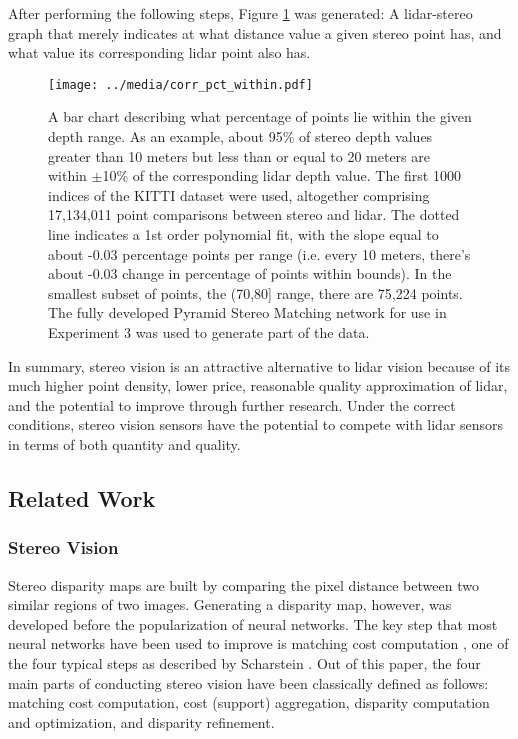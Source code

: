 After performing the following steps, Figure \ref{corr_stereo_lidar} was generated: A lidar-stereo graph that merely indicates at what distance value a given stereo point has, and what value its corresponding lidar point also has.

\begin{figure}[ht]
	\centering
	\texttt{[image: ../media/corr\_pct\_within.pdf]}
	\caption{A bar chart describing what percentage of points lie within the given depth range. As an example, about 95\% of stereo depth values greater than 10 meters but less than or equal to 20 meters are within $\pm$10\% of the corresponding lidar depth value. The first 1000 indices of the KITTI dataset were used, altogether comprising 17,134,011 point comparisons between stereo and lidar. The dotted line indicates a 1st order polynomial fit, with the slope equal to about -0.03 percentage points per range (i.e. every 10 meters, there's about -0.03 change in percentage of points within bounds). In the smallest subset of points, the (70,80] range, there are 75,224 points. The fully developed Pyramid Stereo Matching network for use in Experiment 3 was used to generate part of the data.}
	\label{corr_stereo_lidar}
\end{figure}

In summary, stereo vision is an attractive alternative to lidar vision because of its much higher point density, lower price, reasonable quality approximation of lidar, and the potential to improve through further research. Under the correct conditions, stereo vision sensors have the potential to compete with lidar sensors in terms of both quantity and quality.



\newpage
\subsection{Related Work} %

\subsubsection{Stereo Vision}
Stereo disparity maps are built by comparing the pixel distance between two similar regions of two images. Generating a disparity map, however, was developed before the popularization of neural networks. The key step that most neural networks have been used to improve is matching cost computation \cite{chang_pyramid_2018},  one of the four typical steps as described by Scharstein \cite{scharstein_taxonomy_2002}. Out of this paper, the four main parts of conducting stereo vision have been classically defined as follows: matching cost computation, cost (support) aggregation, disparity computation and optimization, and disparity refinement.

